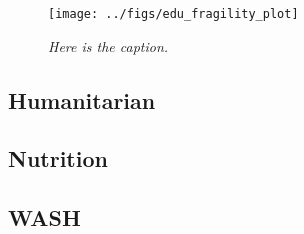\documentclass{article}\usepackage[]{graphicx}\usepackage[]{color}
\begin{document}
\begin{figure}[htbp]
  \centering
  \texttt{[image: ../figs/edu\_fragility\_plot]} \hfill
  \caption{\it Here is the caption.}
  \label{fig:edu_frag_plot}
\end{figure}





\subsection{Humanitarian}










\subsection{Nutrition}














\subsection{WASH}
\end{document}
